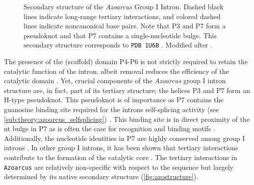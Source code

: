 \documentclass[../../master.tex]{subfiles}
\begin{document}
\begin{figure}[!ht]
	\centering
	
	\caption[Secondary Structure of the \textit{Azoarcus} Group I Intron]{Secondary structure of the \textit{Azoarcus} Group I Intron. Dashed black lines indicate long-range tertiary interactions, and colored dashed lines indicate noncanonical base pairs. Note that P3 and P7 form a pseudoknot and that P7 contains a single-nucleotide bulge. This secondary structure corresponds to \texttt{PDB 1U6B} \parencite{adams_crystal_2004}. Modified after \parencite[Figure 1A]{mustoe_secondary_2016}.
	}\label{fig:azostructure}
\end{figure}


The presence of the (scaffold) domain P4-P6 is not strictly required to retain the catalytic function of the intron, albeit removal reduces the efficiency of the catalytic domain \parencite{hayden_intramolecular_2015}.
Yet, crucial components of the \textit{Azoarcus} group I intron structure are, in fact, part of its tertiary structure; the helices P3 and P7 form an H-type pseudoknot.
This pseudoknot is of importance as P7 contains the guanosine binding site required for the introns self-splicing activity (see \autoref{sub:theory:azoarcus_selfsplicing}) \parencite{kuo_characterization_1999}.
This binding site is in direct proximity of the \unit[1]{nt} bulge in P7 as is often the case for recognition and binding motifs \parencite{turner_bulges_1992, hermann_rna_2000}.
Additionally, the nucleotide identities in P7 are highly conserved among group I introns \parencite{zhou_gissd_2008}.
In other group I introns, it has been shown that tertiary interactions contribute to the formation of the catalytic core \parencite{tanner_joining_1997}.
The tertiary interactions in \texttt{Azoarcus} are relatively non-specific with respect to the sequence but largely determined by its native secondary structure \parencite{mustoe_secondary_2016} (\autoref{fig:azostructure}).
\end{document}
